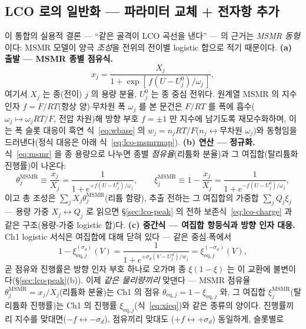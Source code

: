 \documentclass[11pt,a4paper]{article}
\newcommand{\eq}{\mathrm{eq}}
\begin{document}
\subsection{LCO 로의 일반화 — 파라미터 교체 + 전자항 추가}\label{sec:lco-code}
이 통합의 실용적 결론 — ``같은 골격이 LCO 곡선을 낸다'' — 의 근거는 \emph{MSMR 동형}이다:
MSMR 모델\cite{msmr2024}이 양극 \emph{조성}을 전위의 전이별 logistic
합으로 적기 때문이다.
\textbf{(a) 출발 — MSMR 종별 점유식.}
\begin{equation}
x_j=\frac{X_j}{1+\exp[\,f(U-U_j^0)/\omega_j\,]},
\label{eq:msmr}
\end{equation}
여기서 $X_j$ 는 종(전이) $j$ 의 용량 분율, $U_j^0$ 는 종 중심 전위다. 원계열 MSMR 의 지수 인자
$f=F/RT$(항상 양)$\cdot$무차원 폭 $\omega_j$ 를 본 문건은 $F/RT$ 를 폭에 흡수($\omega_j\mapsto\omega_jRT/F$,
전압 차원)해 방향 부호 $f=\pm1$ 만 지수에 남기도록 재모수화하며, 이는 폭 슬롯 대응이 흑연
식~\eqref{eq:wbase} 의 $w_j=n_jRT/F$($n_j\leftrightarrow$무차원 $\omega_j$)와 동형임을 드러낸다(정식
대응은 아래 식~\eqref{eq:lco-msmrmap}).
\textbf{(b) 연산 — 정규화.} 식~\eqref{eq:msmr} 을 종 용량으로 나누면
종별 \emph{점유율}(리튬화 분율)과 그 여집합(탈리튬화 진행률)이 나온다:
\begin{equation}
\theta_j^{\mathrm{MSMR}}\equiv\frac{x_j}{X_j}=\frac{1}{1+e^{+f(U-U_j^0)/\omega_j}},\qquad
\xi_j^{\mathrm{MSMR}}\equiv1-\frac{x_j}{X_j}=\frac{1}{1+e^{-f(U-U_j^0)/\omega_j}},
\label{eq:lco-msmrnorm}
\end{equation}
이고 총 조성은 $\sum_jX_j\theta_j^{\mathrm{MSMR}}$(리튬 함량), 추출 전하는 그 여집합의 가중합
$\sum_jQ_j\xi_j$ — 용량 가중 $X_j\!\leftrightarrow\!Q_j$ 로 읽으면 \S\ref{sec:lco-peak} 의 전하
보존식~\eqref{eq:lco-charge} 과 같은 구조(용량-가중 logistic 합)다.
\textbf{(c) 중간식 — 여집합 항등식과 방향 인자 대응.} Ch1 logistic 서식은 여집합에 대해 닫혀 있다 —
같은 중심$\cdot$폭에서
\begin{equation}
1-\xi_{\eq,j}^{(\sigma_d)}(V)
=\frac{1}{1+e^{+\sigma_d(V-U_j^{\,d})/w_j}}
=\xi_{\eq,j}^{(-\sigma_d)}(V),
\label{eq:lco-comp}
\end{equation}
곧 점유와 진행률은 방향 인자 부호 하나로 오가며 종 $\xi(1-\xi)$ 는 이 교환에 불변이다(\S\ref{sec:lco-peak}(b)). 이제 \emph{같은 물리량끼리} 맞댄다 — MSMR 점유율
$\theta_j^{\mathrm{MSMR}}=x_j/X_j$(리튬화 분율)는 Ch1 의 점유 $\theta_{\eq,j}=1-\xi_{\eq,j}$ 와, 그 여집합
$\xi_j^{\mathrm{MSMR}}$(탈리튬화 진행률)는 Ch1 의 진행률 $\xi_{\eq,j}$(식~\eqref{eq:xieq})와 같은 종류의
양이다. 진행률끼리 지수를 맞대면($-f\leftrightarrow-\sigma_d$), 점유끼리 맞대도
($+f\leftrightarrow+\sigma_d$) 동일하게, 슬롯별로
\end{document}
